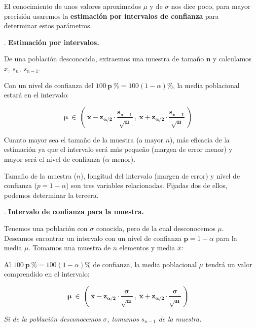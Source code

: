 El conocimiento de unos valores aproximados $\mu$ y de $\sigma$  nos dice poco, para mayor precisión usaremos la  \textbf{estimación por intervalos de confianza} para determinar estos parámetros.

\vspace{4mm}%
\begin{definition}
.		\textbf{Estimación por intervalos.}

\vspace{2mm} De una población desconocida, extraemos una muestra de tamaño $\boldsymbol{n}$ y calculamos $\bar x, \ s_n,\ s_{n-1} $.

\vspace{2mm} Con un nivel de confianza del $100 \ \boldsymbol{p} \ \%=100(1-\alpha)\%$, la media poblacional estará en el intervalo:

$$\boldsymbol{ 
\mu \ \in \ \left( \ 
\bar x - z_{\alpha/2} \cdot \dfrac{s_{n-1}}{\sqrt{n}} 
\ , \ 
\bar x + z_{\alpha/2} \cdot \dfrac{s_{n-1}}{\sqrt{n}} \ \right) 
} $$
\end{definition}

\vspace{2mm} Cuanto mayor sea el tamaño de la muestra (a mayor $n$), más eficacia de la estimación ya que el intervalo será más pequeño (margen de error menor) y mayor será el nivel de confianza ($\alpha$ menor).

\vspace{2mm} Tamaño de la muestra ($n$), longitud del intervalo (margen de error) y nivel de confianza ($p=1-\alpha$) son tres variables relacionadas. Fijadas dos de ellos, podemos determinar la tercera.


\vspace{4mm}%
\begin{definition}
.		\textbf{Intervalo de confianza para la muestra.}

\vspace{2mm}  Tenemos una población con $\sigma$ conocida, pero de la cual desconocemos $\mu$. Deseamos encontrar un intervalo con un nivel de confianza $\boldsymbol{p}=1-\alpha$ para la media $\mu$. Tomamos una muestra de $n$ elementos y media $\bar x$:

\vspace{2mm} Al  $100 \ \boldsymbol{p} \ \%=100(1-\alpha)\%$ de confianza, la media poblacional $\mu$ tendrá un valor comprendido en el intervalo:

$$\boldsymbol{
\mu \ \in \ \left( \ 
\bar x - z_{\alpha/2} \cdot \dfrac{\sigma}{\sqrt{n}} 
\ , \ 
\bar x + z_{\alpha/2} \cdot \dfrac{\sigma}{\sqrt{n}} \ \right) 
}$$

\vspace{3mm} \textit{Si de la población desconocemos $\sigma$, tomamos $s_{n-1}$ de la muestra.}
\end{definition}



